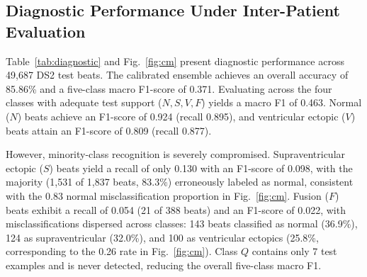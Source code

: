 \documentclass[conference]{IEEEtran}
\begin{document}
\begin{table}[t]
\centering
\caption{Diagnostic Performance on Unseen Patients (DS2)}
\label{tab:diagnostic}
\end{table}

\subsection{Diagnostic Performance Under Inter-Patient Evaluation}
Table~\ref{tab:diagnostic} and Fig.~\ref{fig:cm} present diagnostic performance across 49,687 DS2 test beats. The calibrated ensemble achieves an overall accuracy of 85.86\% and a five-class macro F1-score of 0.371. Evaluating across the four classes with adequate test support ($N, S, V, F$) yields a macro F1 of 0.463. Normal ($N$) beats achieve an F1-score of 0.924 (recall 0.895), and ventricular ectopic ($V$) beats attain an F1-score of 0.809 (recall 0.877).

However, minority-class recognition is severely compromised. Supraventricular ectopic ($S$) beats yield a recall of only 0.130 with an F1-score of 0.098, with the majority (1,531 of 1,837 beats, 83.3\%) erroneously labeled as normal, consistent with the 0.83 normal misclassification proportion in Fig.~\ref{fig:cm}. Fusion ($F$) beats exhibit a recall of 0.054 (21 of 388 beats) and an F1-score of 0.022, with misclassifications dispersed across classes: 143 beats classified as normal (36.9\%), 124 as supraventricular (32.0\%), and 100 as ventricular ectopics (25.8\%, corresponding to the 0.26 rate in Fig.~\ref{fig:cm}). Class $Q$ contains only 7 test examples and is never detected, reducing the overall five-class macro F1.
\end{document}
